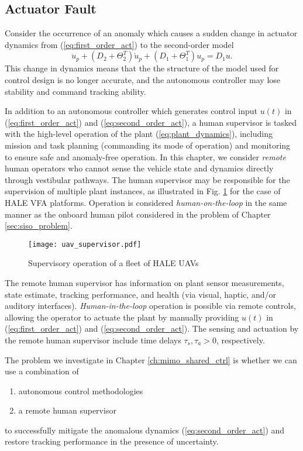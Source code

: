 \subsection{Actuator Fault} \label{subsec:mimo_act_fault}
Consider the occurrence of an anomaly which causes a sudden change in actuator dynamics from (\ref{eq:first_order_act}) to the second-order model
\begin{equation}
	\ddot{u}_p + (D_2 + \Theta_2^T) \dot{u}_p + (D_1 + \Theta_1^T) u_p = D_1 u. \label{eq:second_order_act}
\end{equation}
This change in dynamics means that the the structure of the model used for control design is no longer accurate, and the autonomous controller may lose stability and command tracking ability.

In addition to an autonomous controller which generates control input $u(t)$ in (\ref{eq:first_order_act}) and (\ref{eq:second_order_act}), a human supervisor is tasked with the high-level operation of the plant (\ref{eq:plant_dynamics}), including mission and task planning (commanding its mode of operation) and monitoring to ensure safe and anomaly-free operation. In this chapter, we consider \textit{remote} human operators who cannot sense the vehicle state and dynamics directly through vestibular pathways. The human supervisor may be responsible for the supervision of multiple plant instances, as illustrated in Fig. \ref{fig:uav_supervisor} for the case of HALE VFA platforms. Operation is considered \textit{human-on-the-loop} in the same manner as the onboard human pilot considered in the problem of Chapter \ref{sec:siso_problem}. 

\begin{figure}[htbp]
	\centering
	\texttt{[image: uav\_supervisor.pdf]}
	\caption{Supervisory operation of a fleet of HALE UAVs}
	\label{fig:uav_supervisor}
\end{figure}

The remote human supervisor has information on plant sensor measurements, state estimate, tracking performance, and health (via visual, haptic, and/or auditory interfaces). \textit{Human-in-the-loop} operation is possible via remote controls, allowing the operator to actuate the plant by manually providing $u(t)$ in (\ref{eq:first_order_act}) and (\ref{eq:second_order_act}). The sensing and actuation by the remote human supervisor include time delays $\tau_s, \tau_a > 0$, respectively.

The problem we investigate in Chapter \ref{ch:mimo_shared_ctrl} is whether we can use a  combination of 
\begin{enumerate}[label=(\alph*)]
	\item autonomous control methodologies
	\item a remote human supervisor
\end{enumerate}
  to successfully mitigate the anomalous dynamics (\ref{eq:second_order_act}) and restore tracking performance in the presence of uncertainty. 
  
